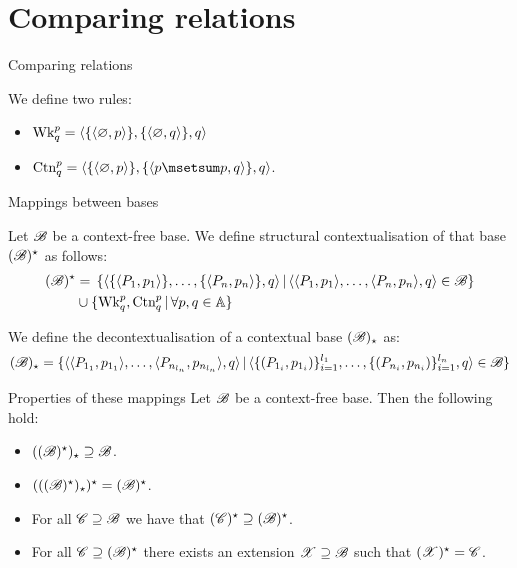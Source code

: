 \documentclass{beamer}
\begin{document}
\section{Comparing relations}
\begin{frame}{Comparing relations}
\begin{definition}
	We define two rules:
	\begin{itemize}
		\item $\text{Wk}^p_q = \langle\openaddrule\langle \emptymultiset, p\rangle\closeaddrule, \openaddrule\langle\emptymultiset, q\rangle\closeaddrule, q \rangle$
		\item $\text{Ctn}^p_q = \langle\openaddrule\langle \emptymultiset, p\rangle\closeaddrule, \openaddrule\langle p\msetsum p,q\rangle\closeaddrule, q \rangle$.
	\end{itemize}
\end{definition}
\end{frame}
\begin{frame}{Mappings between bases}
	\pause
	\begin{definition}
		Let $\baseB$ be a context-free base. We define structural contextualisation of that base $\iplill{\baseB}$ as follows: 
		\begin{align*}
		\iplill{\baseB} &= \,\{ \langle\openaddrule\langle P_1, p_1\rangle\closeaddrule, \dots, \openaddrule\langle P_n, p_n\rangle\closeaddrule, q\rangle \, | \, \langle\langle P_1, p_1\rangle, \dots, \langle P_n, p_n\rangle, q\rangle\in\baseB \}\\ 
		& \cup \{\text{Wk}^p_q, \text{Ctn}^p_q \,|\, \forall p, q \in \At\}
		\end{align*}
	\end{definition}
	We define the decontextualisation of a contextual base $\illipl{\baseB}$
	as:
	\[
	\illipl{\baseB} = \{ \langle\langle P_{1_1}, p_{1_{1}}\rangle,\dots,\langle P_{n_{l_n}}, p_{n_{l_n}}\rangle, q\rangle \, |\, \langle\openaddrule(P_{1_i}, p_{1_{i}})\Closeaddrule{i=1}{l_1},\dots,\openaddrule(P_{n_i}, p_{n_{i}}) \Closeaddrule{i=1}{l_n}, q\rangle \in \baseB\}
	\]
\end{frame}
\begin{frame}{Properties of these mappings}
	Let $\baseB$ be a context-free base. Then the following hold:
	\begin{itemize}
		\item $\illipl{\iplill{\baseB}}\baseGeq \baseB$.
		\pause
		\item $\iplill{\illipl{\iplill{\baseB}}}= \iplill{\baseB}$.
		\pause 
		\item For all $\baseC\baseGeq\baseB$ we have that $\iplill{\baseC}\baseGeq\iplill{\baseB}$.
		\pause
		\item For all $\baseC\baseGeq\iplill{\baseB}$ there exists an extension $\baseX\baseGeq\baseB$ such that $\iplill{\baseX}=\baseC$. 
	\end{itemize}

\end{frame}
\end{document}
